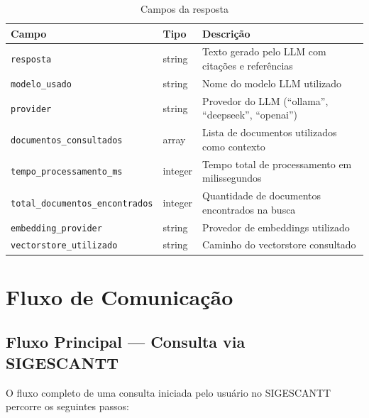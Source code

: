 \documentclass[12pt, a4paper]{article}
\begin{document}
\begin{table}[H]
\centering
\small
\caption{Campos da resposta}
\label{tab:resp_campos}
\begin{tabularx}{\textwidth}{l l X}
\toprule
\textbf{Campo} & \textbf{Tipo} & \textbf{Descrição} \\
\midrule
\texttt{resposta} & string & Texto gerado pelo LLM com citações e referências \\
\texttt{modelo\_usado} & string & Nome do modelo LLM utilizado \\
\texttt{provider} & string & Provedor do LLM (``ollama'', ``deepseek'', ``openai'') \\
\texttt{documentos\_consultados} & array & Lista de documentos utilizados como contexto \\
\texttt{tempo\_processamento\_ms} & integer & Tempo total de processamento em milissegundos \\
\texttt{total\_documentos\_encontrados} & integer & Quantidade de documentos encontrados na busca \\
\texttt{embedding\_provider} & string & Provedor de embeddings utilizado \\
\texttt{vectorstore\_utilizado} & string & Caminho do vectorstore consultado \\
\bottomrule
\end{tabularx}
\end{table}

\section{Fluxo de Comunicação}

\subsection{Fluxo Principal --- Consulta via SIGESCANTT}

O fluxo completo de uma consulta iniciada pelo usuário no SIGESCANTT percorre os seguintes passos:
\end{document}

